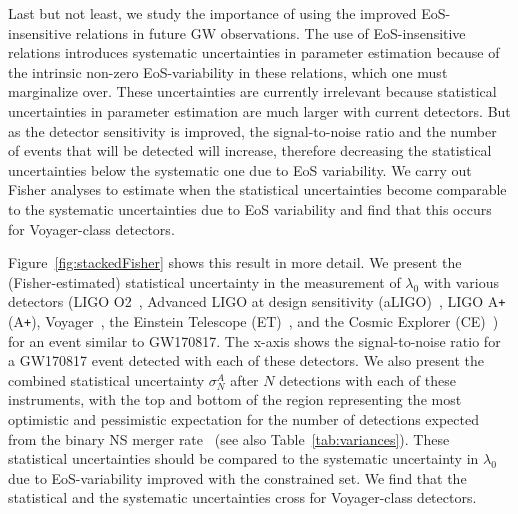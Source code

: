 \documentclass[prd,twocolumn,nofootinbib,superscriptaddress,amsmath,amssymb]{revtex4-1}
\begin{document}
Last but not least, we study the importance of using the improved EoS-insensitive relations in future GW observations. The use of EoS-insensitive relations introduces systematic uncertainties in parameter estimation because of the intrinsic non-zero EoS-variability in these relations, which one must marginalize over. These uncertainties are currently irrelevant because statistical uncertainties in parameter estimation are much larger with current detectors. But as the detector sensitivity is improved, the signal-to-noise ratio and the number of events that will be detected will increase, therefore decreasing the statistical uncertainties below the systematic one due to EoS variability. We carry out Fisher analyses to estimate when the statistical uncertainties become comparable to the systematic uncertainties due to EoS variability and find that this occurs for Voyager-class detectors. 

Figure~\ref{fig:stackedFisher} shows this result in more detail. We present the (Fisher-estimated) statistical uncertainty in the measurement of $\lambda_{0}$ with various detectors (LIGO O2~\cite{aLIGO}, Advanced LIGO at design sensitivity (aLIGO)~\cite{aLIGO}, LIGO A\texttt{+} (A\texttt{+})\cite{Ap_Voyager_CE}, Voyager~\cite{Ap_Voyager_CE}, the Einstein Telescope (ET)~\cite{ET}, and the Cosmic Explorer (CE)~\cite{Ap_Voyager_CE}) for an event similar to GW170817. The x-axis shows the signal-to-noise ratio for a GW170817 event detected with each of these detectors. We also present the combined statistical uncertainty $\sigma^A_N$ after $N$ detections with each of these instruments, with the top and bottom of the region representing the most optimistic and pessimistic expectation for the number of detections expected from the binary NS merger rate~\cite{Abbott2017} (see also Table~\ref{tab:variances}). These statistical uncertainties should be compared to the systematic uncertainty in $\lambda_{0}$ due to EoS-variability improved with the constrained set. We find that the statistical and the systematic uncertainties cross for Voyager-class detectors.
\end{document}
